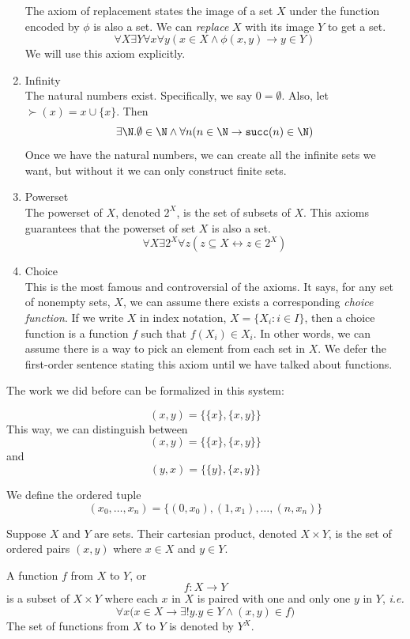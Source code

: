 \documentclass{scrbook}
\renewcommand{\implies}{\to}
\renewcommand{\iff}{\leftrightarrow}
\newcommand{\ie}{\emph{i.e.}\xspace}
\begin{document}
\begin{enumerate}
  
  The axiom of replacement states the image of a set $X$ under the function encoded by $\phi$ is also a set. We can \emph{replace} $X$ with its image $Y$ to get a set.
  \[
  \forall X \exists Y \forall x \forall y (x\in X \wedge \phi(x,y) \implies y\in Y)
  \]
  We will use this axiom explicitly. 
\item Infinity \\
  The natural numbers exist. Specifically, we say $0=\emptyset$. Also, let $\succ(x)=x\cup \{x\}$. Then
  \[
  \exists \N . \emptyset\in\N \wedge \forall n ( n\in \N\implies \succ(n)\in\N)
  \]
  Once we have the natural numbers, we can create all the infinite sets we want, but without it we can only construct finite sets. 
\item Powerset \\
  The powerset of $X$, denoted $2^X$, is the set of subsets of $X$. This axioms guarantees that the powerset of set $X$ is also a set. 
  \[
  \forall X \exists 2^X \forall z (z\subseteq X \iff z \in 2^X)
  \]
\item Choice \\
This is the most famous and controversial of the \zfc axioms. It says, for any set of nonempty sets, $X$, we can assume there exists a corresponding \emph{choice function}. If we write $X$ in index notation, $X=\{X_i:i\in I\}$, then a choice function is a function $f$ such that $f(X_i)\in X_i$. In other words, we can assume there is a way to pick an element from each set in $X$. We defer the first-order sentence stating this axiom until we have talked about functions.  
 \label{zfc:choice}
\end{enumerate}
The work we did before can be formalized in this system:
\begin{defn}
 \[(x,y)=\{\{x\},\{x,y\}\}\]
 This way, we can distinguish between
 \[
 (x,y)=\{\{x\},\{x,y\}\}
 \]
 and
 \[
 (y,x)=\{\{y\},\{x,y\}\}
 \]
\end{defn}
\begin{defn}
  We define the ordered tuple
  \[
  (x_0,\dots,x_n)= \{(0,x_0),(1,x_1),\dots,(n,x_n)\}
  \]
\end{defn}

\begin{defn}
  Suppose $X$ and $Y$ are sets. Their cartesian product, denoted $X\times Y$, is the set of ordered pairs $(x,y)$ where $x\in X$ and $y\in Y$. 
\end{defn}

\begin{defn}[function]
  A function $f$ from $X$ to $Y$, or 
  \[
  f: X\to Y
  \]
  is a subset of $X\times Y$ where each $x$ in $X$ is paired with one and only one $y$ in $Y$, \ie
  \[
  \forall x \bigl(x\in X \implies\exists! y. y\in Y \wedge (x,y)\in f\bigr)
  \]
  The set of functions from $X$ to $Y$ is denoted by  $Y^X$. 
\end{defn}
\end{document}

